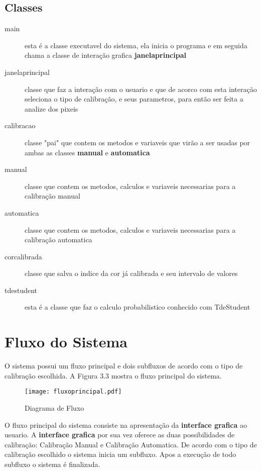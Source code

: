\subsection{Classes}
	\begin{description}

	\item [main] esta é a classe executavel do sistema, ela inicia o programa e em seguida chama a classe de interação grafica \textbf{janelaprincipal}  
	
	\item [janelaprincipal]	classe que faz a interação com o usuario e que de acorco com esta interação seleciona o tipo de calibração, e seus parametros, para então ser feita a analize dos pixeis	
		
	\item [calibracao] classe "pai" que contem os metodos e variaveis que virão a ser usadas por ambas as classes \textbf{manual} e \textbf{automatica}
	
	\item [manual] classe que contem os metodos, calculos e variaveis necessarias para a calibração manual
	
	\item [automatica] classe que contem os metodos, calculos e variaveis necessarias para a calibração automatica
			
	\item [corcalibrada] classe que salva o indice da cor já calibrada e seu intervalo de valores
	
	\item [tdestudent] esta é a classe que faz o calculo probabilistico conhecido com TdeStudent
	

	\end{description}

	

	\section{Fluxo do Sistema}
O sistema possui um fluxo principal e dois subfluxos de acordo com o tipo de calibração escolhida. A Figura 3.3 mostra o fluxo principal do sistema.
		\begin{figure}[!h]
			\centering
			\texttt{[image: fluxoprincipal.pdf]}
			\caption{Diagrama de Fluxo}
			\label{FlowCHart}
		\end{figure} 
		
		 O fluxo principal do sistema consiste na apresentação da \textbf{interface grafica} ao usuario. A \textbf{interface grafica} por sua vez oferece as duas possibilidades de calibração: Calibração Manual e Calibração Automatica. De acordo com o tipo de calibração escolhido o sistema inicia um subfluxo. Apos a execução de todo subfluxo o sistema é finalizada.
		
